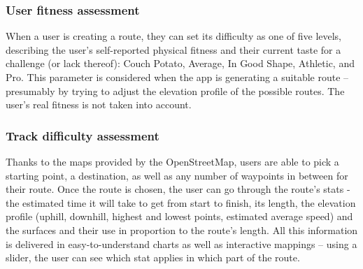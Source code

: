 \subsubsection*{User fitness assessment}
When a user is creating a route, they can set its difficulty as one of five levels, 
describing the user's self-reported physical fitness and their current taste for a challenge (or lack thereof): Couch Potato, Average, In Good Shape, Athletic, and Pro.
This parameter is considered when the app is generating a suitable route -- presumably by trying to adjust the elevation profile of the possible routes.
The user's real fitness is not taken into account.
\subsubsection*{Track difficulty assessment} 
Thanks to the maps provided by the OpenStreetMap, users are able to pick a starting point, a destination, as well as any number of waypoints in between for their route.
Once the route is chosen, the user can go through the route's stats - the estimated time it will take to get from start to finish, its length, the elevation profile (uphill, downhill, highest and lowest points, estimated average speed) and the surfaces and their use in proportion to the route's length.
All this information is delivered in easy-to-understand charts as well as interactive mappings -- using a slider, the user can see which stat applies in which part of the route.

